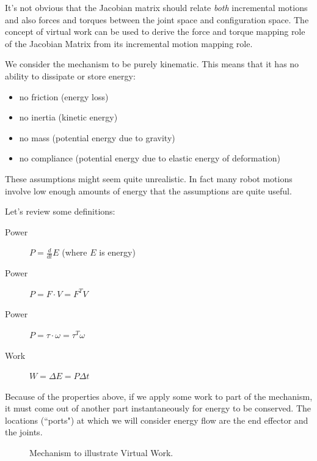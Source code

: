 It's not obvious that the Jacobian matrix should relate {\it both} incremental motions and also forces and torques between the joint space and configuration space.
The concept of virtual work can be used to derive the force and torque mapping role of the
Jacobian Matrix from its incremental motion mapping role.


We consider the mechanism to be purely kinematic. This means that it has
no ability to dissipate or  store energy:
\begin{itemize}
\item no friction (energy loss)
\item no inertia (kinetic energy)
\item no mass (potential energy due to gravity)
\item no compliance (potential energy due to elastic energy of deformation)
\end{itemize}
These assumptions might seem quite unrealistic.  In fact many robot motions involve low enough amounts of energy that the assumptions are quite useful.

Let's review some definitions:

\begin{description}
\item[Power] $P = \frac{d}{dt}E$ (where $E$ is energy)
\item[Power] $P = F \cdot V = F^TV$
\item[Power] $P = \tau \cdot \omega = \tau^T\omega$
\item[Work] $W = \Delta E = P\Delta t$
\end{description}

Because of the properties above, if we apply some work to part of the mechanism, it must come out of another part instantaneously for energy to be conserved.
The locations (``ports") at which we will consider energy flow are the end effector and the joints.

\begin{figure}[h]
\centering
{}
\caption{Mechanism to illustrate Virtual Work.}\label{Crank}
\end{figure}


